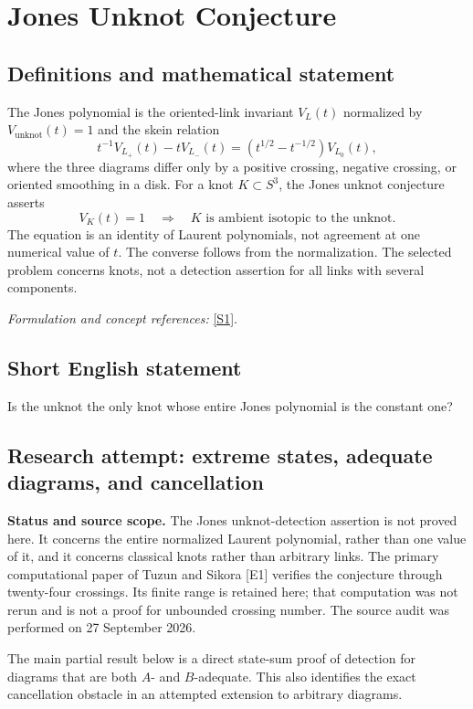 \documentclass[11pt]{article}
\begin{document}
\section*{\texorpdfstring{Jones Unknot Conjecture}{Jones Unknot Conjecture}}\label{statement}
\subsection{Definitions and mathematical statement}
The Jones polynomial is the oriented-link invariant $V_L(t)$ normalized by $V_{\mathrm{unknot}}(t)=1$ and the skein relation
\[
 t^{-1}V_{L_+}(t)-tV_{L_-}(t)
 =(t^{1/2}-t^{-1/2})V_{L_0}(t),
\]
where the three diagrams differ only by a positive crossing, negative crossing, or oriented smoothing in a disk. For a knot $K\subset S^3$, the Jones unknot conjecture asserts
\[
 V_K(t)=1\quad\Longrightarrow\quad K\text{ is ambient isotopic to the unknot}.
\]
The equation is an identity of Laurent polynomials, not agreement at one numerical value of $t$. The converse follows from the normalization. The selected problem concerns knots, not a detection assertion for all links with several components.
\par\smallskip\textit{Formulation and concept references:} \href{https://encyclopediaofmath.org/wiki/Jones_unknotting_conjecture}{[S1]}.

\subsection{Short English statement}
Is the unknot the only knot whose entire Jones polynomial is the constant one?
\subsection{Research attempt: extreme states, adequate diagrams, and cancellation}
\textbf{Status and source scope.} The Jones unknot-detection assertion is not proved here. It concerns the entire normalized Laurent polynomial, rather than one value of it, and it concerns classical knots rather than arbitrary links. The primary computational paper of Tuzun and Sikora [E1] verifies the conjecture through twenty-four crossings. Its finite range is retained here; that computation was not rerun and is not a proof for unbounded crossing number. The source audit was performed on 27 September 2026.

The main partial result below is a direct state-sum proof of detection for diagrams that are both $A$- and $B$-adequate. This also identifies the exact cancellation obstacle in an attempted extension to arbitrary diagrams.
\end{document}
